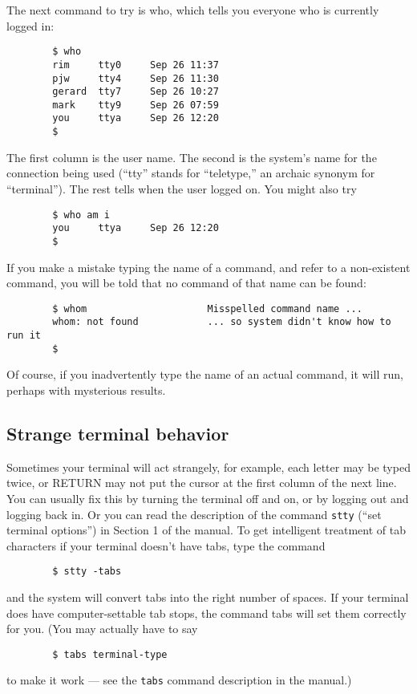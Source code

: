 The next command to try is who, which tells you everyone who is currently logged
in:
\begin{verbatim}
        $ who
        rim     tty0     Sep 26 11:37
        pjw     tty4     Sep 26 11:30
        gerard  tty7     Sep 26 10:27
        mark    tty9     Sep 26 07:59
        you     ttya     Sep 26 12:20
        $
\end{verbatim}
The first column is the user name. The second is the system's name for the
connection being used (``tty'' stands for ``teletype,'' an archaic synonym for
``terminal''). The rest tells when the user logged on. You might also try
\begin{verbatim}
        $ who am i
        you     ttya     Sep 26 12:20
        $
\end{verbatim}

If you make a mistake typing the name of a command, and refer to a non-existent
command, you will be told that no command of that name can be found:
\begin{verbatim}
        $ whom                     Misspelled command name ...    
        whom: not found            ... so system didn't know how to run it
        $
\end{verbatim}
Of course, if you inadvertently type the name of an actual command, it will run,
perhaps with mysterious results.


\subsection{Strange terminal behavior}

Sometimes your terminal will act strangely, for example, each letter may be
typed twice, or RETURN may not put the cursor at the first column of the next
line. You can usually fix this by turning the terminal off and on, or by logging
out and logging back in. Or you can read the description of the command
\texttt{stty} (``set terminal options'') in Section 1 of the manual. To get
intelligent treatment of tab characters if your terminal doesn't have tabs, type
the command
\begin{verbatim}
        $ stty -tabs
\end{verbatim}
and the system will convert tabs into the right number of spaces. If your
terminal does have computer-settable tab stops, the command tabs will set them
correctly for you. (You may actually have to say
\begin{verbatim}
        $ tabs terminal-type
\end{verbatim}
to make it work --- see the \texttt{tabs} command description in the manual.)


